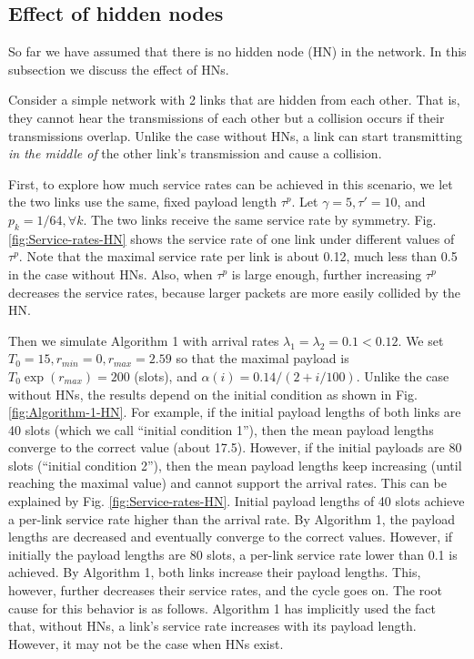 \documentclass{IEEEtran}
\begin{document}
\subsection{\label{sub:HN}Effect of hidden nodes}

So far we have assumed that there is no hidden node (HN) in the network.
In this subsection we discuss the effect of HNs. 

Consider a simple network with 2 links that are hidden from each other.
That is, they cannot hear the transmissions of each other but a collision
occurs if their transmissions overlap. Unlike the case without HNs,
a link can start transmitting \emph{in the middle of }the other link's
transmission and cause a collision.

First, to explore how much service rates can be achieved in this scenario,
we let the two links use the same, fixed payload length $\tau^{p}$.
Let $\gamma=5,\tau'=10$, and $p_{k}=1/64,\forall k$. The two links
receive the same service rate by symmetry. Fig. \ref{fig:Service-rates-HN}
shows the service rate of one link under different values of $\tau^{p}$.
Note that the maximal service rate per link is about 0.12, much less
than 0.5 in the case without HNs. Also, when $\tau^{p}$ is large
enough, further increasing $\tau^{p}$ decreases the service rates,
because larger packets are more easily collided by the HN.

Then we simulate Algorithm 1 with arrival rates $\lambda_{1}=\lambda_{2}=0.1<0.12$.
We set $T_{0}=15,r_{min}=0,r_{max}=2.59$ so that the maximal payload
is $T_{0}\exp(r_{max})=200$ (slots), and $\alpha(i)=0.14/(2+i/100)$.
Unlike the case without HNs, the results depend on the initial condition
as shown in Fig. \ref{fig:Algorithm-1-HN}. For example, if the initial
payload lengths of both links are 40 slots (which we call {}``initial
condition 1''), then the mean payload lengths converge to the correct
value (about 17.5). However, if the initial payloads are 80 slots
({}``initial condition 2''), then the mean payload lengths keep
increasing (until reaching the maximal value) and cannot support the
arrival rates. This can be explained by Fig. \ref{fig:Service-rates-HN}.
Initial payload lengths of 40 slots achieve a per-link service rate
higher than the arrival rate. By Algorithm 1, the payload lengths
are decreased and eventually converge to the correct values. However,
if initially the payload lengths are 80 slots, a per-link service
rate lower than 0.1 is achieved. By Algorithm 1, both links increase
their payload lengths. This, however, further decreases their service
rates, and the cycle goes on. The root cause for this behavior is
as follows. Algorithm 1 has implicitly used the fact that, without
HNs, a link's service rate increases with its payload length. However,
it may not be the case when HNs exist.
\end{document}
